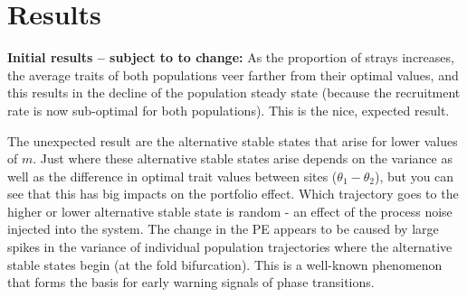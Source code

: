 \documentclass[onecolumn,preprintnumbers,amsmath,amssymb,superscriptaddress]{revtex4}
\begin{document}
\section*{Results}










{\bf Initial results -- subject to to change:} As the proportion of strays increases, the average traits of both populations veer farther from their optimal values, and this results in the decline of the population steady state (because the recruitment rate is now sub-optimal for both populations). This is the nice, expected result.

The unexpected result are the alternative stable states that arise for lower values of $m$. Just where these alternative stable states arise depends on the variance as well as the difference in optimal trait values between sites ($\theta_1-\theta_2$), but you can see that this has big impacts on the portfolio effect.
Which trajectory goes to the higher or lower alternative stable state is random - an effect of the process noise injected into the system.
The change in the PE appears to be caused by large spikes in the variance of individual population trajectories where the alternative stable states begin (at the fold bifurcation).
This is a well-known phenomenon that forms the basis for early warning signals of phase transitions.
\end{document}
